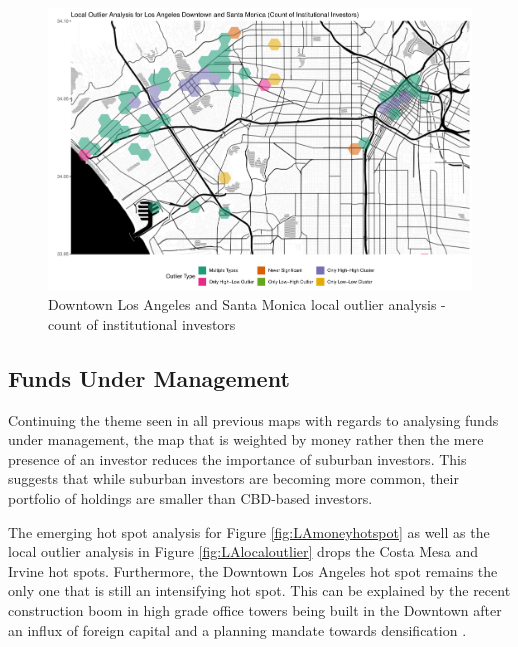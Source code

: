 \begin{figure}
	\centering
	\includegraphics[width=1\linewidth]{Figures/ChapterIV/LA_Count_LO_Downtown}
	\caption[Downtown Los Angeles and Santa Monica Local Outlier Analysis - Count of Institutional Investors 1999-2018]{Downtown Los Angeles and Santa Monica local outlier analysis - count of institutional investors}
	\label{fig:LAcountlocaloutliercount_Downtown}
\end{figure}	

\subsection{Funds Under Management}

Continuing the theme seen in all previous maps with regards to analysing funds under management, the map that is weighted by money rather then the mere presence of an investor reduces the importance of suburban investors.  This suggests that while suburban investors are becoming more common, their portfolio of holdings are smaller than CBD-based investors.  

The emerging hot spot analysis for Figure \ref{fig:LAmoneyhotspot} as well as the local outlier analysis in Figure \ref{fig:LAlocaloutlier} drops the Costa Mesa  and Irvine hot spots.  Furthermore, the Downtown Los Angeles hot spot remains the only one that is still an intensifying hot spot.  This can be explained by the recent construction boom in high grade office towers being built in the Downtown after an influx of foreign capital and a planning mandate towards densification \citep{Marino19}.  


